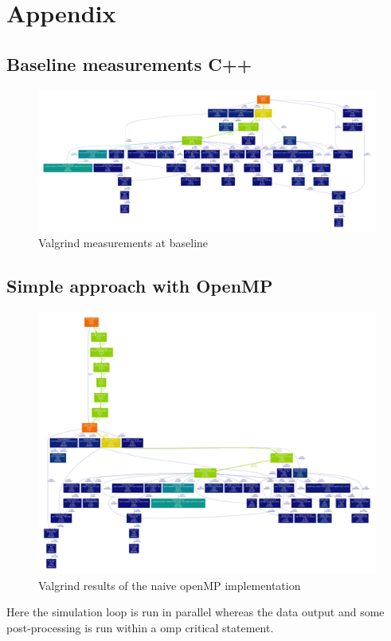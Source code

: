 \section{Appendix}
\subsection{Baseline measurements C++}

\begin{figure}[!htbp]
  \centering
  \includegraphics[height=0.50\textheight, angle=90]{images/profBaseLine.pdf}
  \caption{Valgrind measurements at baseline}
  \label{fig:baseline}
\end{figure}


\subsection{Simple approach with OpenMP}
\begin{figure}[!htbp]
  \centering
  \includegraphics[height=0.85\textheight, angle=90]{images/profOpenMPSimple.pdf}
  \caption{Valgrind results of the naive openMP implementation}
  \label{fig:naiveOpenMP}
\end{figure}

Here the simulation loop is run in parallel whereas the data output
and some post-processing is run within a omp critical statement.


